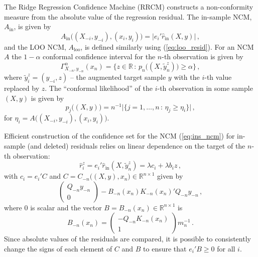 \documentclass[10pt, conference, compsocconf]{IEEEtran}
\newcommand{\Real}{\mathbb{R}}
\begin{document}
The Ridge Regression Confidence Machine (RRCM) constructs a non-conformity measure
from the absolute value of the regression residual. The in-sample NCM, $A_{\text{in}}$,
is given by
\begin{equation} \label{eq:ins_ncm}
  A_{\text{in}}\bigl((X_{-i}, y_{-i}), (x_i, y_i)\bigr) = |e_i' \hat{r}_{\text{in}}(X, y)| \,,
\end{equation}
and the LOO NCM, $A_{\text{loo}}$, is defined similarly using (\ref{eq:loo_resid}).
For an NCM $A$ the $1 - \alpha$ conformal confidence interval for the $n$-th observation
is given by
\begin{equation} \label{eq:conf_ci}
  \Gamma_{X_{-n}, y_{-n}}^\alpha(x_n)
    = \bigl\{ z\in \Real \,:\, p_n\bigl((X, \tilde{y}_n^z)\bigr) \geq \alpha \bigr\}
    \,,
\end{equation}
where $\tilde{y}_i^z = (y_{-i}, z)$ -- the augmented target sample $y$ with the
$i$-th value replaced by $z$. The ``conformal likelihood'' of the $i$-th observation
in some sample $(X, y)$ is given by
\begin{equation*}
  p_j\bigl((X, y)\bigr)
    = n^{-1} \bigl\lvert \bigl\{
        j = 1,\ldots, n \, : \,
        \eta_j \geq \eta_i
    \bigr\} \bigr\rvert
    \,,
\end{equation*}
for $\eta_i = A\bigl((X_{-i}, y_{-i}), (x_i, y_i)\bigr)$.

Efficient construction of the confidence set for the NCM (\ref{eq:ins_ncm}) for
in-sample (and deleted) residuals relies on linear dependence on the target of the
$n$-th observation:
\begin{equation} \label{eq:krr_in_resid}
  \hat{r}_i^z
    = e_i' \hat{r}_{\text{in}}(X, \tilde{y}_n^z)
    = \lambda c_i + \lambda b_i z
    \,,
\end{equation}
with $c_i = e_i' C$ and $C=C_{-n}\bigl((X, y), x_n\bigr)\in\Real^{n\times 1}$
given by
\begin{equation*}
  \begin{pmatrix} Q_{-n} y_{-n} \\ 0 \end{pmatrix}
    - B_{-n}(x_n) K_{-n}(x_n)' Q_{-n} y_{-n}
    \,,
\end{equation*}
where $0$ is scalar and the vector $B=B_{-n}(x_n)\in\Real^{n\times 1}$ is
\begin{equation} \label{eq:krr_in_resid_B}
  B_{-n}(x_n)
    = \begin{pmatrix} - Q_{-n} K_{-n}(x_n) \\ 1 \end{pmatrix} m_n^{-1}
    \,.
\end{equation}
Since absolute values of the residuals are compared, it is possible to consistently
change the signs of each element of $C$ and $B$ to ensure that $e_i'B\geq 0$ for
all $i$.
\end{document}
